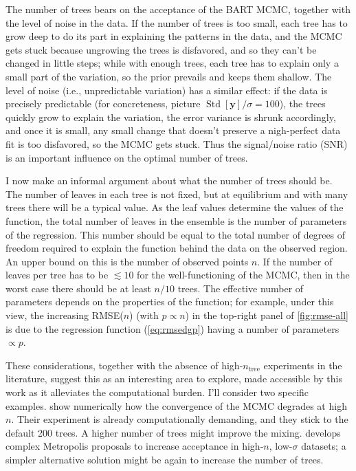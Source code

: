 \documentclass{article}
\let\oldmarginpar\marginpar
\renewcommand{\marginpar}[1]{\oldmarginpar{\sffamily\scriptsize #1}}
\begin{document}
    The number of trees bears on the acceptance of the BART MCMC, together with the level of noise in the data. If the number of trees is too small, each tree has to grow deep to do its part in explaining the patterns in the data, and the MCMC gets stuck because ungrowing the trees is disfavored, and so they can't be changed in little steps; while with enough trees, each tree has to explain only a small part of the variation, so the prior prevails and keeps them shallow. The level of noise (i.e., unpredictable variation) has a similar effect: if the data is precisely predictable (for concreteness, picture $\operatorname{Std}[\mathbf y]/\sigma = 100$), the trees quickly grow to explain the variation, the error variance is shrunk accordingly, and once it is small, any small change that doesn't preserve a nigh-perfect data fit is too disfavored, so the MCMC gets stuck. Thus the signal/noise ratio (SNR) is an important influence on the optimal number of trees.\marginpar{Cite pratola?}

    I now make an informal argument about what the number of trees should be. The number of leaves in each tree is not fixed, but at equilibrium and with many trees there will be a typical value. As the leaf values determine the values of the function, the total number of leaves in the ensemble is the number of parameters of the regression. This number should be equal to the total number of degrees of freedom required to explain the function behind the data on the observed region. An upper bound on this is the number of observed points $n$. If the number of leaves per tree has to be $\lesssim 10$ for the well-functioning of the MCMC, then in the worst case there should be at least $n/10$ trees. The effective number of parameters depends on the properties of the function; for example, under this view, the increasing RMSE($n$) (with $p \propto n$) in the top-right panel of \autoref{fig:rmse-all} is due to the regression function (\autoref{eq:rmsedgp}) having a number of parameters $\propto p$.

    These considerations, together with the absence of high-$n_\text{tree}$ experiments in the literature, suggest this as an interesting area to explore, made accessible by this work as it alleviates the computational burden. I'll consider two specific examples. \textcite[\S4.1]{ronen2022} show numerically how the convergence of the MCMC degrades at high $n$. Their experiment is already computationally demanding, and they stick to the default 200 trees. A higher number of trees might improve the mixing. \textcite{pratola2016} develops complex Metropolis proposals to increase acceptance in high-$n$, low-$\sigma$ datasets; a simpler alternative solution might be again to increase the number of trees.
\end{document}
